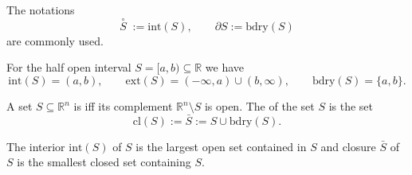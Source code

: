 \documentclass[10pt,a4paper,UTF8]{article}
\begin{document}
The notations \[ \stackrel{\circ}{S}\;:=\mathrm{int}(S),\qquad \partial S := \mathrm{bdry}(S)\]
are commonly used.


For the half open interval \(S=[a,b)\subseteq\mathbb{R}\) we have \[\mathrm{int}(S)=(a,b),\qquad \mathrm{ext}(S)=(-\infty,a)\cup (b,\infty),\qquad \mathrm{bdry}(S)=\{a,b\}.\]

\begin{definition}
A set \(S\subseteq\mathbb{R}^n\) is  iff its complement
\(\mathbb{R}^n\setminus S\) is open. The  of the set \(S\)
is the set
$$
   \mathrm{cl}(S):=\bar{S}:=S\cup\mathrm{bdry}(S).
$$
\end{definition}

\begin{tikztheorem}
The interior \(\mathrm{int}(S)\) of \(S\) is the largest open set contained in \(S\)  and closure  \(\bar{S}\) of \(S\)  is the smallest closed set containing \(S\).
\end{tikztheorem}
\end{document}
